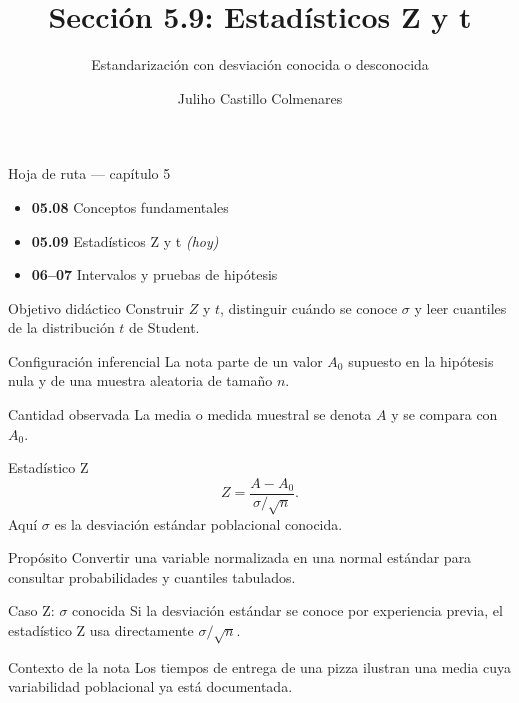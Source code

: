 \documentclass[10pt,aspectratio=169]{beamer}
\title[Estadísticos Z y t]{Sección 5.9: Estadísticos Z y t}
\subtitle{Estandarización con desviación conocida o desconocida}
\author[J. Castillo Colmenares]{Juliho Castillo Colmenares}
\institute{Tecnológico de Monterrey}
\date{}
\begin{document}
\begin{frame}[plain]\vspace{-0.8cm}\titlepage\end{frame}

\begin{frame}{Hoja de ruta --- capítulo 5}
  \footnotesize
  \begin{itemize}\itemsep=0.08cm
    \item \textbf{05.08} Conceptos fundamentales
    \item \textbf{05.09} Estadísticos Z y t \emph{(hoy)}
    \item \textbf{06--07} Intervalos y pruebas de hipótesis
  \end{itemize}
  \begin{block}{Objetivo didáctico}
    Construir $Z$ y $t$, distinguir cuándo se conoce $\sigma$ y leer cuantiles de
    la distribución $t$ de Student.
  \end{block}
\end{frame}

\begin{frame}{Configuración inferencial}
  \footnotesize
  La nota parte de un valor $A_0$ supuesto en la hipótesis nula y de una muestra
  aleatoria de tamaño $n$.
  \begin{block}{Cantidad observada}
    La media o medida muestral se denota $A$ y se compara con $A_0$.
  \end{block}
\end{frame}

\begin{frame}{Estadístico Z}
  \footnotesize
  \[
    Z=\frac{A-A_0}{\sigma/\sqrt n}.
  \]
  Aquí $\sigma$ es la desviación estándar poblacional conocida.
  \begin{alertblock}{Propósito}
    Convertir una variable normalizada en una normal estándar para consultar
    probabilidades y cuantiles tabulados.
  \end{alertblock}
\end{frame}

\begin{frame}{Caso Z: $\sigma$ conocida}
  \footnotesize
  Si la desviación estándar se conoce por experiencia previa, el estadístico Z
  usa directamente $\sigma/\sqrt n$.
  \begin{exampleblock}{Contexto de la nota}
    Los tiempos de entrega de una pizza ilustran una media cuya variabilidad
    poblacional ya está documentada.
  \end{exampleblock}
\end{frame}
\end{document}
